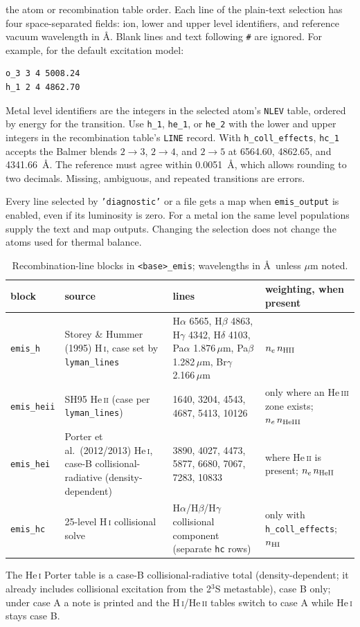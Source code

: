 \documentclass[english,a4paper]{my_memo}
\newcommand{\code}[1]{\texttt{#1}}
\begin{document}
\begin{itemize}
the atom or recombination table order. Each line of the plain-text selection
has four space-separated fields: ion, lower and upper level identifiers,
and reference vacuum wavelength in \AA. Blank lines and text following
\code{\#} are ignored. For example, for the default excitation model:
\begin{verbatim}
o_3 3 4 5008.24
h_1 2 4 4862.70
\end{verbatim}
Metal level identifiers are the integers in the selected atom's
\code{NLEV} table, ordered by energy for the transition.
Use \code{h\_1}, \code{he\_1}, or \code{he\_2} with the lower and upper
integers in the recombination table's \code{LINE} record.
With \code{h\_coll\_effects}, \code{hc\_1} accepts the Balmer blends
$2\to3$, $2\to4$, and $2\to5$ at 6564.60, 4862.65, and 4341.66~\AA.
The reference must agree within 0.0051~\AA, which allows rounding to
two decimals. Missing, ambiguous, and repeated transitions are errors.
\end{itemize}

Every line selected by \code{'diagnostic'} or a file gets a map when
\code{emis\_output} is enabled, even if its luminosity is zero. For a metal
ion the same level populations supply the text and map outputs. Changing
the selection does not change the atoms used for thermal balance.

\begingroup\small
\begin{longtable}{@{}l p{3.3cm} p{6.0cm} p{3.0cm}@{}}
\caption{Recombination-line blocks in \code{<base>\_emis}; wavelengths in
  \AA\ unless $\mu$m noted.}\label{tab:reclines}\\
\toprule
block & source & lines & weighting, when present \\
\midrule
\endfirsthead
\code{emis\_h} & Storey \& Hummer (1995) H\,\textsc{i}, case set by
  \code{lyman\_lines} & H$\alpha$ 6565, H$\beta$ 4863, H$\gamma$ 4342,
  H$\delta$ 4103, Pa$\alpha$ 1.876\,$\mu$m, Pa$\beta$ 1.282\,$\mu$m,
  Br$\gamma$ 2.166\,$\mu$m & $n_e\,n_{\rm HII}$ \\
\code{emis\_heii} & SH95 He\,\textsc{ii} (case per \code{lyman\_lines}) &
  1640, 3204, 4543, 4687, 5413, 10126 & only where an He\,\textsc{iii}
  zone exists; $n_e\,n_{\rm HeIII}$ \\
\code{emis\_hei} & Porter et al.\ (2012/2013) He\,\textsc{i}, case-B
  collisional-radiative (density-dependent) &
  3890, 4027, 4473, 5877, 6680, 7067, 7283, 10833 & where He\,\textsc{ii}
  is present; $n_e\,n_{\rm HeII}$ \\
\code{emis\_hc} & 25-level H\,\textsc{i} collisional solve &
  H$\alpha$/H$\beta$/H$\gamma$ collisional component (separate \code{hc}
  rows) & only with \code{h\_coll\_effects}; $n_{\rm HI}$ \\
\bottomrule
\end{longtable}
\endgroup
\noindent\small The He\,\textsc{i} Porter table is a case-B
collisional-radiative total (density-dependent; it already includes
collisional excitation from the 2$^3$S metastable), case B only; under case A
a note is printed and the H\,\textsc{i}/He\,\textsc{ii} tables switch to
case A while He\,\textsc{i} stays case B.\normalsize
\end{document}

